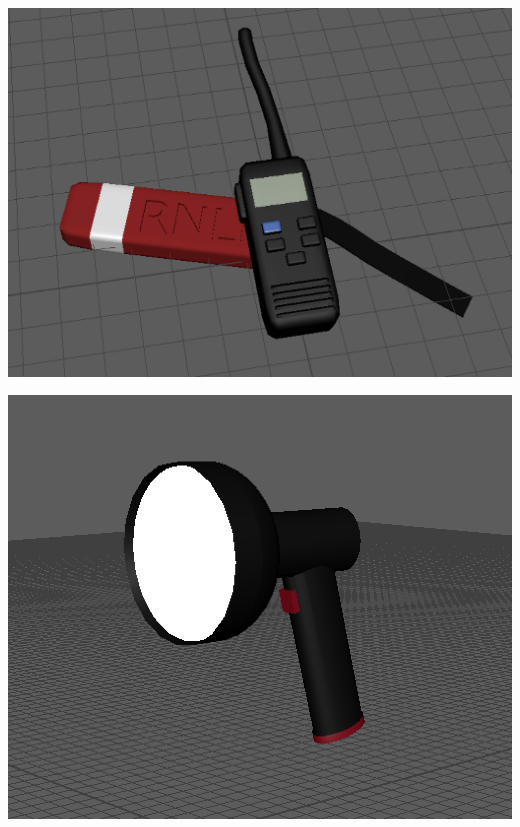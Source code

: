 \documentclass[ %
                    author={Elis Jones},
                supervisor={Dr. Kirsten Cater},
                    degree={BSc},
                     title={The Effect of Presentation Medium on Spatial Cognition},
                  subtitle={in the Virtual Environment},
                      year={2018} ]{dissertation}
\begin{document}
\begin{minipage}{\textwidth}
\begin{center}
\begin{minipage}{0.25\textwidth}
    \end{minipage}\hfill
    \begin{minipage}{0.25\textwidth}
        \centering
        \includegraphics[width=1\textwidth]{images/handheld.png}
    \end{minipage}\hfill
    \begin{minipage}{0.25\textwidth}
        \centering
        \includegraphics[width=1\textwidth]{images/light.png}
    \end{minipage}\hfill
\end{center}
\begin{center}
    \centering
    \begin{minipage}{0.25\textwidth}

\end{minipage}
\end{center}
\end{minipage}
\end{document}
